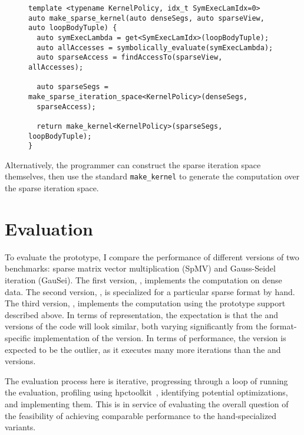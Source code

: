 \begin{figure}
\begin{lstlisting}[caption={Abbreviated implementation of the function for creating a computation that automatically constructs the sparse iteration space.}, label=makeSparseKernelAlg]
template <typename KernelPolicy, idx_t SymExecLamIdx=0>
auto make_sparse_kernel(auto denseSegs, auto sparseView, auto loopBodyTuple) {
  auto symExecLambda = get<SymExecLamIdx>(loopBodyTuple);
  auto allAccesses = symbolically_evaluate(symExecLambda);
  auto sparseAccess = findAccessTo(sparseView, allAccesses);

  auto sparseSegs = make_sparse_iteration_space<KernelPolicy>(denseSegs, 
  sparseAccess);

  return make_kernel<KernelPolicy>(sparseSegs, loopBodyTuple);
}
\end{lstlisting}
\end{figure}

Alternatively, the programmer can construct the sparse iteration space themselves, then use the standard \verb.make_kernel. to generate the computation over the sparse iteration space.

\section{Evaluation}\label{sec:sparseEval}
To evaluate the prototype, I compare the performance of different versions of two benchmarks: sparse matrix vector multiplication (SpMV) and Gauss-Seidel iteration (GauSei).
The first version, \dense, implements the computation on dense data. 
The second version, \specialized, is specialized for a particular sparse format by hand. 
The third version, \sparseraja, implements the computation using the prototype support described above.
In terms of representation, the expectation is that the \dense{} and \sparseraja{} versions of the code will look similar, both varying significantly from the format-specific implementation of the \specialized{} version.
In terms of performance, the \dense{} version is expected to be the outlier, as it executes many more iterations than the \sparseraja{} and \specialized{} versions.

The evaluation process here is iterative, progressing through a loop of running the evaluation, profiling using hpctoolkit~\cite{adhianto2010hpctoolkit}, identifying potential optimizations, and implementing them. 
This is in service of evaluating the overall question of the feasibility of achieving comparable performance to the hand-specialized variants.


